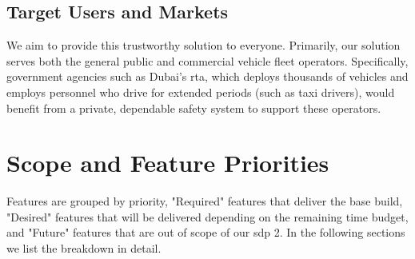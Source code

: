 \subsection{Target Users and Markets}

We aim to provide this trustworthy solution to everyone. Primarily, our solution serves both the general public and commercial vehicle fleet operators. Specifically, government agencies such as Dubai's \gls{rta}, which deploys thousands of vehicles and employs personnel who drive for extended periods (such as taxi drivers), would benefit from a private, dependable safety system to support these operators.

\section{Scope and Feature Priorities}

Features are grouped by priority, "Required" features that deliver the base build, "Desired" features that will be delivered depending on the remaining time budget, and "Future" features that are out of scope of our \gls{sdp} 2. In the following sections we list the breakdown in detail.

